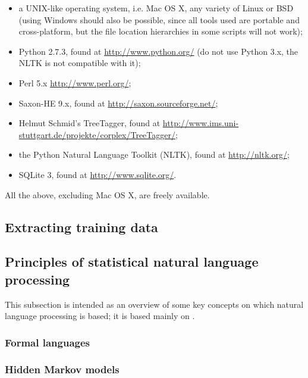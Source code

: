 \documentclass[10pt,a4paper,twoside,openright,titlepage,fleqn,%
               headinclude,,footinclude,BCOR5mm,%
               numbers=noenddot,cleardoublepage=empty,%
               tablecaptionabove]{scrbook}
\begin{document}
\begin{itemize}
  \item a UNIX-like operating system, i.e. Mac OS X, any variety of Linux or BSD (using Windows should also be possible, since all tools used are portable and cross-platform, but the file location hierarchies in some scripts will not work);
  \item Python 2.7.3, found at \url{http://www.python.org/} (do not use Python 3.x, the NLTK is not compatible with it);
  \item Perl 5.x \url{http://www.perl.org/};
  \item Saxon-HE 9.x, found at \url{http://saxon.sourceforge.net/};
  \item Helmut Schmid's TreeTagger, found at \url{http://www.ims.uni-stuttgart.de/projekte/corplex/TreeTagger/};
  \item the Python Natural Language Toolkit (NLTK), found at \url{http://nltk.org/};
  \item SQLite 3, found at \url{http://www.sqlite.org/}.
\end{itemize}

All the above, excluding Mac OS X, are freely available.


\subsection{Extracting training data} %
\label{sub:extract_training_data}


\subsection{Principles of statistical natural language processing} %
\label{sub:principles-nlp}

This subsection is intended as an overview of some key concepts on which
natural language processing is based; it is based mainly on 
\citet{manning1999}.

\subsubsection{Formal languages} %
\label{sub:formallang}


\subsubsection{Hidden Markov models} %
\label{ssub:markovchains}
\end{document}
